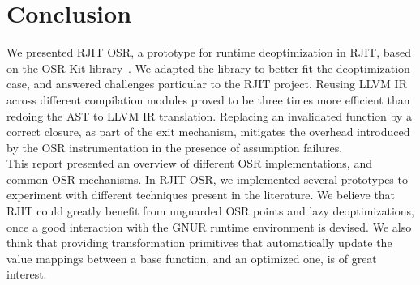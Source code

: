 
\chapter{Conclusion} %

\label{Chapter6} %


\newcommand{\keyword}[1]{\textbf{#1}}
\newcommand{\tabhead}[1]{\textbf{#1}}
\newcommand{\code}[1]{\texttt{#1}}
\newcommand{\file}[1]{\texttt{\bfseries#1}}
\newcommand{\option}[1]{\texttt{\itshape#1}}


  

We presented RJIT OSR, a prototype for runtime deoptimization in RJIT, based on the OSR Kit library~\cite{OSRKit}.
We adapted the library to better fit the deoptimization case, and answered challenges particular to the RJIT project.
Reusing LLVM IR across different compilation modules proved to be three times more efficient than redoing the AST to LLVM IR translation.
Replacing an invalidated function by a correct closure, as part of the exit mechanism, mitigates the overhead introduced by the OSR instrumentation in the presence of assumption failures.\\

This report presented an overview of different OSR implementations, and common OSR mechanisms.
In RJIT OSR, we implemented several prototypes to experiment with different techniques present in the literature.
We believe that RJIT could greatly benefit from unguarded OSR points and lazy deoptimizations, once a good interaction with the GNUR runtime environment is devised.
We also think that providing transformation primitives that automatically update the value mappings between a base function, and an optimized one, is of great interest.\\


